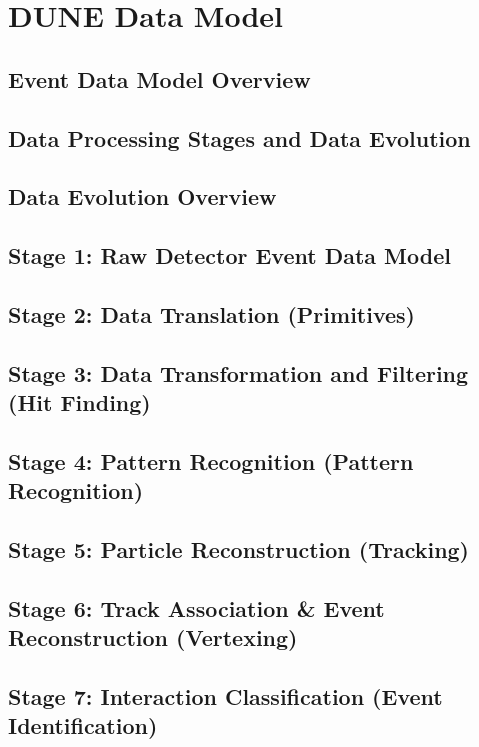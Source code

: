 
%
\chapter{ DUNE Data Model } 
\section{Event Data Model Overview}
\section{Data Processing Stages and Data Evolution}
\section{Data Evolution Overview}
\section{Stage 1: Raw Detector Event Data Model}
\section{Stage 2: Data Translation (Primitives)}
\section{Stage 3: Data Transformation and Filtering (Hit Finding)}
\section{Stage 4: Pattern Recognition (Pattern Recognition)}
\section{Stage 5: Particle Reconstruction (Tracking)}
\section{Stage 6: Track Association \& Event Reconstruction  (Vertexing)}
\section{Stage 7: Interaction Classification (Event Identification)}
